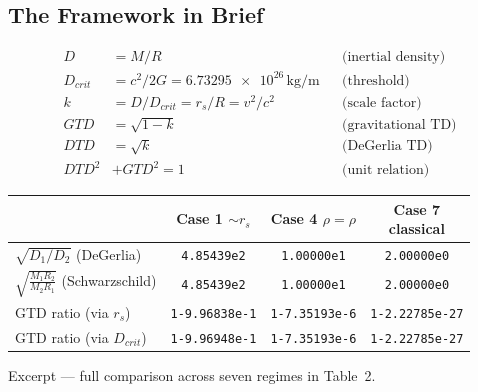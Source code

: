 
\subsection*{The Framework in Brief}

\begin{align*}
D        &= M/R                      &&\text{(inertial density)}\\
D_{crit} &= c^2/2G = \num{6.73295e26}\,\unit{\kilogram\per\meter} &&\text{(threshold)}\\
k        &= D/D_{crit} = r_{s}/R = v^2/c^2 &&\text{(scale factor)}\\
GTD      &= \sqrt{1-k}               &&\text{(gravitational TD)}\\
DTD      &= \sqrt{k}                 &&\text{(DeGerlia TD)}\\
DTD^2 &+ GTD^2 = 1                   &&\text{(unit relation)}
\end{align*}

\begin{center}
\small
\begin{tabular}{@{}l ccc@{}}
\toprule
 & \makecell{Case 1\\$\sim r_{s}$} & \makecell{Case 4\\$\rho=\rho$} & \makecell{Case 7\\classical}\\
\midrule
$\sqrt{D_1/D_2}$ (DeGerlia)        & \texttt{4.85439e2} & \texttt{1.00000e1} & \texttt{2.00000e0}\\
$\sqrt{\tfrac{M_1R_2}{M_2R_1}}$ (Schwarzschild) & \texttt{4.85439e2} & \texttt{1.00000e1} & \texttt{2.00000e0}\\
\midrule
GTD ratio (via $r_s$)             & \texttt{1-9.96838e-1} & \texttt{1-7.35193e-6} & \texttt{1-2.22785e-27}\\
GTD ratio (via $D_{crit}$)        & \texttt{1-9.96948e-1} & \texttt{1-7.35193e-6} & \texttt{1-2.22785e-27}\\
\bottomrule
\end{tabular}
\end{center}
{\footnotesize Excerpt --- full comparison across seven regimes in Table~2.}
